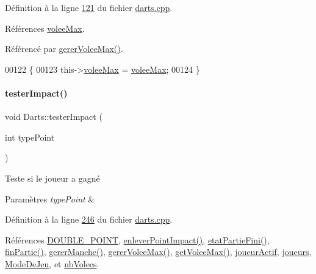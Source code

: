 Définition à la ligne \hyperlink{darts_8cpp_source_l00121}{121} du fichier \hyperlink{darts_8cpp_source}{darts.\+cpp}.



Références \hyperlink{darts_8h_source_l00079}{volee\+Max}.



Référencé par \hyperlink{darts_8cpp_source_l00409}{gerer\+Volee\+Max()}.


\begin{DoxyCode}
00122 \{
00123     this->\hyperlink{class_darts_aed9c6aa8f34fb2dcbc57a5ea24aa6c2a}{voleeMax} = \hyperlink{class_darts_aed9c6aa8f34fb2dcbc57a5ea24aa6c2a}{voleeMax};
00124 \}
\end{DoxyCode}
\mbox{\label{class_darts_af34338eccf367fb9ed939ff95768a221}} 
\paragraph{\texorpdfstring{tester\+Impact()}{testerImpact()}}
{\footnotesize\ttfamily void Darts\+::tester\+Impact (\begin{DoxyParamCaption}\item[{int}]{type\+Point }\end{DoxyParamCaption})\hspace{0.3cm}{\ttfamily [private]}}



Teste si le joueur a gagné 


\begin{DoxyParams}{Paramètres}
{\em type\+Point} & \\
\hline
\end{DoxyParams}


Définition à la ligne \hyperlink{darts_8cpp_source_l00246}{246} du fichier \hyperlink{darts_8cpp_source}{darts.\+cpp}.



Références \hyperlink{darts_8h_source_l00019}{D\+O\+U\+B\+L\+E\+\_\+\+P\+O\+I\+NT}, \hyperlink{darts_8cpp_source_l00274}{enlever\+Point\+Impact()}, \hyperlink{class_darts_a04a60e25e4c6a608a15c6abce35c9dfa}{etat\+Partie\+Fini()}, \hyperlink{class_darts_a751870924fe01a94fbf49ce45451a218}{fin\+Partie()}, \hyperlink{darts_8cpp_source_l00303}{gerer\+Manche()}, \hyperlink{darts_8cpp_source_l00409}{gerer\+Volee\+Max()}, \hyperlink{darts_8cpp_source_l00066}{get\+Volee\+Max()}, \hyperlink{darts_8h_source_l00076}{joueur\+Actif}, \hyperlink{darts_8h_source_l00073}{joueurs}, \hyperlink{darts_8h_source_l00081}{Mode\+De\+Jeu}, et \hyperlink{darts_8h_source_l00080}{nb\+Volees}.



